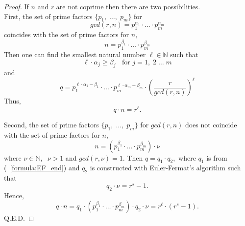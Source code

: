 \documentclass[color=black,11pt]{elegantpaper}
\begin{document}
\begin{proof}
If $n$ and $r$ are not coprime then there are two possibilities. \\

First, the set of prime factors $\{p_1,\;\dots,\;p_m\}$ for 
$$
gcd(r,n) = p_1^{\alpha_1} \cdot \dots \cdot p_m^{\alpha_m}
$$ 
coincides with the set of prime factors for $n,$
$$
n=  p_1^{\beta_1} \cdot \dots \cdot p_m^{\beta_m}
$$
Then one can find the smallest natural number $\ell \in \mathbb{N}$ such that
$$
\ell \cdot \alpha_j \ge \beta_j\;\;\mbox{ for } j =1,\; 2\; \dots \; m
$$
and
\begin{equation}
\label{formula:EF_end}
q =  p_1^{\ell \cdot \alpha_1 - \beta_1} \cdot \dots \cdot p_m^{\ell \cdot \alpha_m -  \beta_m} \cdot (\frac{r}{gcd(r,n)})^{\ell} 
\end{equation}
Thus,
$$
q \cdot n = r^{\ell}. 
$$

Second, the set of prime factors $\{p_1,\;\dots,\;p_m\}$ for  $gcd(r,n)$ does not coincide with the set of prime factors for $n,$
$$
n = (p_1^{\beta_1} \cdot \dots \cdot p_m^{\beta_m}) \cdot \nu
$$
where $\nu \in \mathbb{N},\;\;\nu>1$ and $gcd(r,\nu) =1.$ Then $q= q_1 \cdot q_2,$ where $q_1$ is from (~\ref{formula:EF_end}) and $q_2$ is constructed with Euler-Fermat's algorithm such that
$$
q_2 \cdot  \nu = r^s -1.
$$ 
Hence,
$$
q\cdot n = q_1 \cdot (p_1^{\beta_1} \cdot \dots \cdot p_m^{\beta_m}) \cdot q_2 \cdot  \nu = r^{\ell } \cdot (r^s -1).
$$
\vspace{0.1cm}
Q.E.D.
\vspace{0.1cm}
\end{proof}
\end{document}
